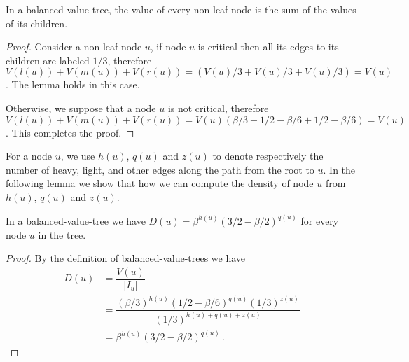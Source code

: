 \begin{lemma}
In a balanced-value-tree, the value of every non-leaf node is the sum of the values of its children.
\end{lemma}
\begin{proof}
Consider a non-leaf node $u$, if node $u$ is critical then all its edges to its children are labeled $1/3$, therefore $V(l(u))+ V(m(u))+ V(r(u)) = (V(u)/3 + V(u)/3 + V(u)/3)= V(u)$. The lemma holds in this case.

Otherwise, we suppose that a node $u$ is not critical, therefore $V(l(u))+ V(m(u))+ V(r(u)) = V(u) (\beta/3 + 1/2-\beta/6 + 1/2-\beta/6) = V(u)$. This completes the proof.
\end{proof}

For a node $u$, we use $h(u)$, $q(u)$ and $z(u)$ to denote respectively the number of heavy, light, and other edges along the path from the root to $u$. In the following lemma we show that how we can compute the density of node $u$ from $h(u)$, $q(u)$ and $z(u)$.
\begin{lemma}
\label{dentree}
In a balanced-value-tree we have $D(u)=\beta ^ {h(u)} (3/2-\beta/2) ^ {q(u)}$ for every node $u$ in the tree.
\end{lemma}
\begin{proof}
By the definition of balanced-value-trees we have
\begin{align*}
D(u) & = \dfrac{V(u)}{|I_u|} \\
& = \dfrac{(\beta/3)^{h(u)} (1/2-\beta/6)^{q(u)} (1/3)^{z(u)} }{(1/3)^{h(u)+q(u)+z(u)}} \\
& = \beta ^ {h(u)} (3/2-\beta/2) ^ {q(u)} \,.
\end{align*}
\end{proof}

